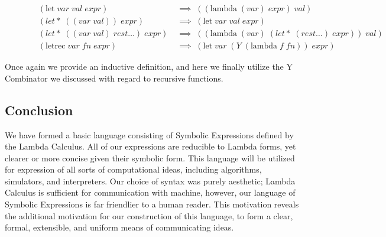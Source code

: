 \begin{figure}[ht]
\caption{}\label{scheme}
\begin{align*}
& (\text{let} \; var \; val \; expr) \; &\implies \; ((\text{lambda} \; (var) \; expr) \; val)
\\& (let* \; ((var \; val)) \; expr) \; &\implies \; (\text{let} \; var \; val \; expr)
\\& (let* \; ((var \; val) \; rest\dots) \; expr) \; &\implies \; ((\text{lambda} \; (var) \; (let* \; (rest\dots) \; expr)) \; val)
\\& (\text{letrec} \; var \; fn \; expr) \; &\implies \; (\text{let} \; var \; (Y \; (\text{lambda} \; f \; fn)) \; expr)
\end{align*}
\end{figure}

Once again we provide an inductive definition, and here we finally utilize the Y 
Combinator we discussed with regard to recursive functions.

\subsection{Conclusion}
We have formed a basic language consisting of Symbolic Expressions defined by the 
Lambda Calculus. All of our expressions are reducible to Lambda forms, yet clearer 
or more concise given their symbolic form. This language will be utilized for 
expression of all sorts of computational ideas, including algorithms, simulators, 
and interpreters. Our choice of syntax was purely aesthetic; Lambda Calculus is 
sufficient for communication with machine, however, our language of Symbolic 
Expressions is far friendlier to a human reader. This motivation reveals the 
additional motivation for our construction of this language, to form a clear, 
formal, extensible, and uniform means of communicating ideas.
